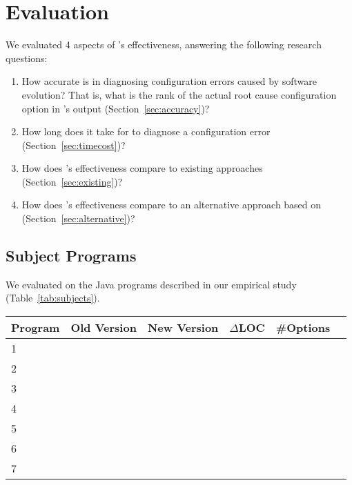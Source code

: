 
\section{Evaluation}
\label{sec:evaluation}

We evaluated 4 aspects of \ourtool's effectiveness, answering
the following research questions:

\begin{enumerate}
\item How accurate is \ourtool in diagnosing configuration errors
caused by software evolution? That is, what is the rank of the
actual root cause configuration option in \ourtool's output (Section~\ref{sec:accuracy})?

\item How long does it take for \ourtool to diagnose
a configuration error (Section~\ref{sec:timecost})?

\item How does \ourtool's effectiveness compare to
existing approaches (Section~\ref{sec:existing})?

\item How does \ourtool's effectiveness compare to
an alternative approach based on  (Section~\ref{sec:alternative})?

\end{enumerate}

\subsection{Subject Programs}

We evaluated \ourtool on the \subjnum Java programs
described in our empirical study (Table~\ref{tab:subjects}).


\begin{table}[t]
\vspace{1mm}
\centering
\small{
\setlength{\tabcolsep}{.80\tabcolsep}
\begin{tabular}{|l||c|c|c|c|c|}
\hline
 Program & Old Version & New Version & $\Delta$LOC & \#Options \\
 \hline
 \hline
 1 &  &  &&   \\
 2 &  & & &  \\
 3 &  & & &  \\
 4 &  & & &  \\
 5 &  & & &  \\
 6 &  & & &  \\
 7 &  & & &  \\
\hline
\hline
\end{tabular}
}
\vspace{-2mm}
\end{table}

